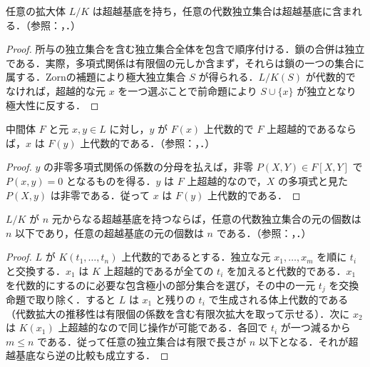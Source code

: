 \begin{prop}[超越基底の存在]
任意の拡大体 $L/K$ は超越基底を持ち，任意の代数独立集合は超越基底に含まれる．（参照：，．）
\end{prop}
\begin{proof}
所与の独立集合を含む独立集合全体を包含で順序付ける．鎖の合併は独立である．実際，多項式関係は有限個の元しか含まず，それらは鎖の一つの集合に属する．Zornの補題により極大独立集合 $S$ が得られる．$L/K(S)$ が代数的でなければ，超越的な元 $x$ を一つ選ぶことで前命題により $S\cup\{x\}$ が独立となり極大性に反する．
\end{proof}
\begin{prop}[超越元の交換]
中間体 $F$ と元 $x,y\in L$ に対し，$y$ が $F(x)$ 上代数的で $F$ 上超越的であるならば，$x$ は $F(y)$ 上代数的である．（参照：，．）
\end{prop}
\begin{proof}
$y$ の非零多項式関係の係数の分母を払えば，非零 $P(X,Y)\in F[X,Y]$ で $P(x,y)=0$ となるものを得る．$y$ は $F$ 上超越的なので，$X$ の多項式と見た $P(X,y)$ は非零である．従って $x$ は $F(y)$ 上代数的である．
\end{proof}
\begin{prop}[有限超越基底の長さ]
$L/K$ が $n$ 元からなる超越基底を持つならば，任意の代数独立集合の元の個数は $n$ 以下であり，任意の超越基底の元の個数は $n$ である．（参照：，．）
\end{prop}
\begin{proof}
$L$ が $K(t_1,\ldots,t_n)$ 上代数的であるとする．独立な元 $x_1,\ldots,x_m$ を順に $t_i$ と交換する．$x_1$ は $K$ 上超越的であるが全ての $t_i$ を加えると代数的である．$x_1$ を代数的にするのに必要な包含極小の部分集合を選び，その中の一元 $t_j$ を交換命題で取り除く．すると $L$ は $x_1$ と残りの $t_i$ で生成される体上代数的である（代数拡大の推移性は有限個の係数を含む有限次拡大を取って示せる）．次に $x_2$ は $K(x_1)$ 上超越的なので同じ操作が可能である．各回で $t_i$ が一つ減るから $m\leq n$ である．従って任意の独立集合は有限で長さが $n$ 以下となる．それが超越基底なら逆の比較も成立する．
\end{proof}
